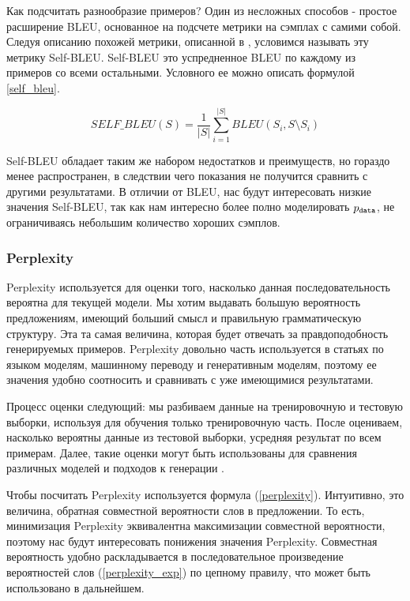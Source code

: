 \documentclass{spbau-diploma}
\begin{document}
Как подсчитать разнообразие примеров? Один из несложных способов - простое 
расширение BLEU, основанное на подсчете метрики на сэмплах с самими собой. 
Следуя описанию похожей метрики, описанной в \cite{1802.01886}, условимся 
называть эту метрику Self-BLEU. Self-BLEU это успредненное BLEU по каждому
из примеров со всеми остальными. Условного ее можно описать формулой 
\ref{self_bleu}.

\begin{equation}
\label{self_bleu}
SELF\_BLEU(S) = \frac{1}{|S|} \sum\limits^{|S|}_{i=1}{BLEU(S_i, S \setminus S_i)}
\end{equation}

Self-BLEU обладает таким же набором недостатков и преимуществ, но гораздо менее
распространен, в следствии чего показания не получится сравнить с другими 
результатами. В отличии от BLEU, нас будут интересовать низкие значения 
Self-BLEU, так как нам интересно более полно моделировать $p_{\texttt{data}}$, не 
ограничиваясь небольшим количество хороших сэмплов.

\subsubsection{Perplexity}
Perplexity используется для оценки того, насколько данная последовательность 
вероятна для текущей модели. Мы хотим выдавать большую вероятность предложениям,
имеющий больший смысл и правильную грамматическую структуру. Эта та самая величина,
которая будет отвечать за правдоподобность генерируемых примеров. Perplexity
довольно часть используется в статьях по языком моделям, машинному переводу и 
генеративным моделям, поэтому ее значения удобно соотносить и сравнивать с уже
имеющимися результатами.

Процесс оценки следующий: мы разбиваем данные на тренировочную и тестовую 
выборки, используя для обучения только тренировочную часть. После оцениваем,
насколько вероятны данные из тестовой выборки, усредняя результат по всем 
примерам. Далее, такие оценки могут быть использованы для сравнения различных 
моделей и подходов к генерации \cite{lecture:lm}.

Чтобы посчитать Perplexity используется формула (\ref{perplexity}). Интуитивно,
это величина, обратная совместной вероятности слов в предложении. То есть, 
минимизация Perplexity эквивалентна максимизации совместной вероятности, поэтому
нас будут интересовать понижения значения Perplexity. Совместная вероятность 
удобно раскладывается в последовательное произведение вероятностей слов 
(\ref{perplexity_exp}) по цепному правилу, что может быть использовано в 
дальнейшем.
\end{document}
